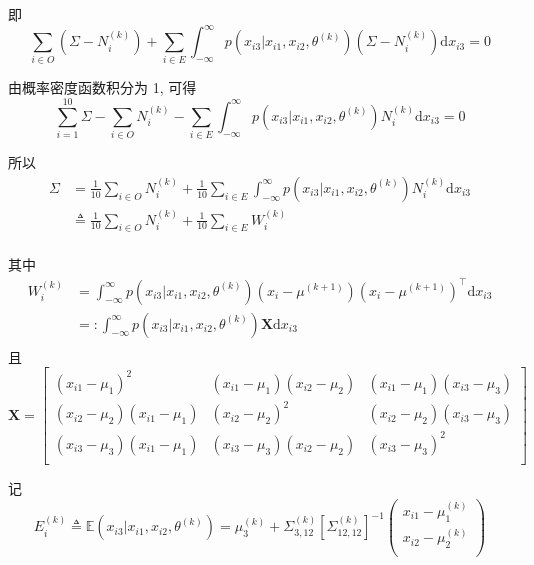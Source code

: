 \documentclass[openany]{ctexbook}
\theoremstyle{kaiti}
\theoremstyle{normal}
\begin{document}
即
\begin{equation}
  \sum_{i\in O}(\Sigma-N_i^{(k)})+\sum_{i\in E}\int_{-\infty}^\infty p(x_{i3}|x_{i1},x_{i2},\theta^{(k)})(\Sigma-N_i^{(k)})\mathrm{d}x_{i3}=0
\end{equation}

由概率密度函数积分为 1, 可得
\begin{equation}
  \sum_{i=1}^{10}\Sigma-\sum_{i\in O}N_i^{(k)}-\sum_{i\in E}\int_{-\infty}^\infty p(x_{i3}|x_{i1},x_{i2},\theta^{(k)})N_i^{(k)}\mathrm{d}x_{i3}=0
\end{equation}

所以
\begin{equation}
  \begin{aligned}
    \Sigma
    &=\frac{1}{10}\sum_{i\in O}N_i^{(k)}+\frac{1}{10}\sum_{i\in E}\int_{-\infty}^\infty p(x_{i3}|x_{i1},x_{i2},\theta^{(k)})N_i^{(k)}\mathrm{d}x_{i3}\\
    &\triangleq\frac{1}{10}\sum_{i\in O}N_i^{(k)}+\frac{1}{10}\sum_{i\in E}W_i^{(k)}\\
  \end{aligned}
\end{equation}

其中
\begin{equation}
  \begin{aligned}
    W_i^{(k)}
    &=\int_{-\infty}^\infty p(x_{i3}|x_{i1},x_{i2},\theta^{(k)})(x_i-\mu^{(k+1)})(x_i-\mu^{(k+1)})^{\top}\mathrm{d}x_{i3}\\
    &=:\int_{-\infty}^\infty p(x_{i3}|x_{i1},x_{i2},\theta^{(k)})\bm{X}\mathrm{d}x_{i3}\\
  \end{aligned}
\end{equation}
且
\begin{equation}
  \bm{X}=\begin{bmatrix}
    (x_{i1}-\mu_1)^2 & (x_{i1}-\mu_1)(x_{i2}-\mu_2) & (x_{i1}-\mu_1)(x_{i3}-\mu_3)\\
    (x_{i2}-\mu_2)(x_{i1}-\mu_1) & (x_{i2}-\mu_2)^2 & (x_{i2}-\mu_2)(x_{i3}-\mu_3)\\
    (x_{i3}-\mu_3)(x_{i1}-\mu_1) & (x_{i3}-\mu_3)(x_{i2}-\mu_2) & (x_{i3}-\mu_3)^2\\
  \end{bmatrix}
\end{equation}

记
\begin{equation}
  E_i^{(k)}\triangleq\mathbb{E}(x_{i3}|x_{i1},x_{i2},\theta^{(k)})=\mu_3^{(k)}+\Sigma_{3,12}^{(k)}\left[\Sigma_{12,12}^{(k)}\right]^{-1}
    \begin{pmatrix}
      x_{i1}-\mu_1^{(k)}\\
      x_{i2}-\mu_2^{(k)}\\
    \end{pmatrix}
\end{equation}
\end{document}
